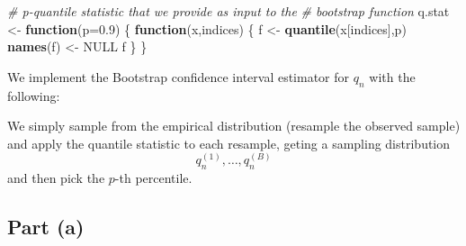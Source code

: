 \documentclass[
  11pt,
]{article}
\newenvironment{Shaded}{\begin{snugshade}}{\end{snugshade}}
\newcommand{\AttributeTok}[1]{\textcolor[rgb]{0.13,0.29,0.53}{#1}}
\newcommand{\CommentTok}[1]{\textcolor[rgb]{0.56,0.35,0.01}{\textit{#1}}}
\newcommand{\ConstantTok}[1]{\textcolor[rgb]{0.56,0.35,0.01}{#1}}
\newcommand{\ControlFlowTok}[1]{\textcolor[rgb]{0.13,0.29,0.53}{\textbf{#1}}}
\newcommand{\DecValTok}[1]{\textcolor[rgb]{0.00,0.00,0.81}{#1}}
\newcommand{\FloatTok}[1]{\textcolor[rgb]{0.00,0.00,0.81}{#1}}
\newcommand{\FunctionTok}[1]{\textcolor[rgb]{0.13,0.29,0.53}{\textbf{#1}}}
\newcommand{\NormalTok}[1]{#1}
\newcommand{\OtherTok}[1]{\textcolor[rgb]{0.56,0.35,0.01}{#1}}
\newcommand{\SpecialCharTok}[1]{\textcolor[rgb]{0.81,0.36,0.00}{\textbf{#1}}}
\newcommand{\StringTok}[1]{\textcolor[rgb]{0.31,0.60,0.02}{#1}}
\begin{document}
\begin{Shaded}
\begin{Highlighting}[]
\CommentTok{\# p{-}quantile statistic that we provide as input to the}
\CommentTok{\# bootstrap function}
\NormalTok{q.stat }\OtherTok{\textless{}{-}} \ControlFlowTok{function}\NormalTok{(}\AttributeTok{p=}\FloatTok{0.9}\NormalTok{)}
\NormalTok{\{}
  \ControlFlowTok{function}\NormalTok{(x,indices)}
\NormalTok{  \{}
\NormalTok{    f }\OtherTok{\textless{}{-}} \FunctionTok{quantile}\NormalTok{(x[indices],p)}
    \FunctionTok{names}\NormalTok{(f) }\OtherTok{\textless{}{-}} \ConstantTok{NULL}
\NormalTok{    f}
\NormalTok{  \}}
\NormalTok{\}}
\end{Highlighting}
\end{Shaded}

We implement the Bootstrap confidence interval estimator for \(q_n\)
with the following:

\begin{Shaded}
\end{Shaded}

We simply sample from the empirical distribution (resample the observed
sample) and apply the quantile statistic to each resample, geting a
sampling distribution \[
  q_n^{(1)},\ldots,q_n^{(B)}
\] and then pick the \(p\)-th percentile.

\hypertarget{part-a-2}{%
\subsection{Part (a)}\label{part-a-2}}

\end{document}
